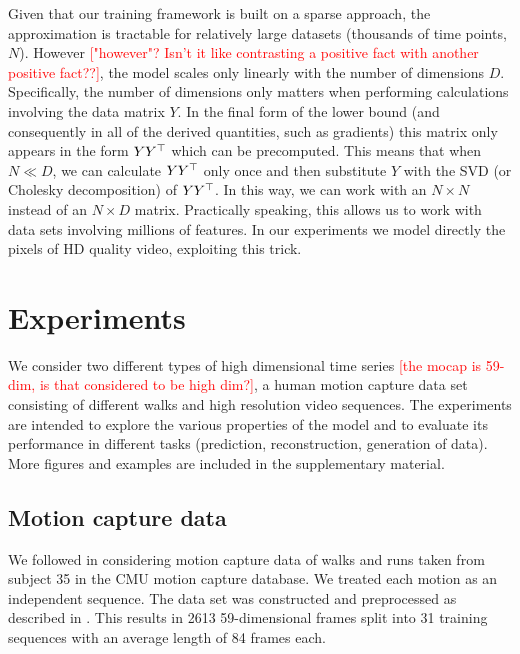 \documentclass{article} %
\begin{document}
Given that our training framework is built on a sparse approach, the
approximation is tractable for relatively large datasets (thousands of
time points, $N$). However \textcolor{red}{["however"? Isn't it like contrasting a positive fact with another positive fact??]},
 the model scales only
linearly with the number of dimensions $D$. Specifically, the number
of dimensions only matters when performing calculations involving the
data matrix $Y$. In the final form of the lower bound (and
consequently in all of the derived quantities, such as gradients) this
matrix only appears in the form $Y Y^{\top}$ which can be precomputed. This
means that when $N \ll D$, we can calculate $Y Y^{\top}$ only once and
then substitute $Y$ with the SVD (or Cholesky decomposition) of $Y
Y^{\top}$. In this way, we can work with an $N \times N$ instead of an $N
\times D$ matrix. Practically speaking, this allows us to work with data sets involving millions of features. In our experiments we model directly the pixels of HD quality video, exploiting this trick.


\section{Experiments}

We consider two different types of high dimensional time series \textcolor{red}{[the mocap is 59-dim, is that considered to be high dim?]}, a human motion capture data set consisting of different walks and high resolution video sequences. The experiments are intended to explore the various properties of the model and to evaluate its performance in different tasks (prediction, reconstruction, generation of data). More figures and examples are included in the supplementary material.

\subsection{Motion capture data}

We followed \cite{Taylor,gplvmLarger} in considering motion capture
data of walks and runs taken from subject 35 in the CMU motion capture
database. We treated each motion as an independent sequence.  The data
set was constructed and preprocessed as described in
\cite{gplvmLarger}. This results in 2613 59-dimensional frames split
into 31 training sequences with an average length of 84 frames each.
\end{document}
